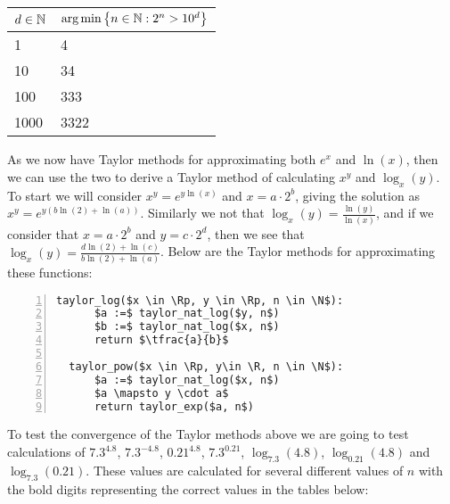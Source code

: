 \begin{center}
\begin{tabular}{|l|l|}
\hline
\(d \in \mathbb{N}\) 
	& \(\textrm{arg}\min\left\{n \in \mathbb{N} : 2^n > 10^d\right\}\)\\\hline
1 & 4\\\hline
10 & 34\\\hline
100 & 333 \\\hline
1000 & 3322\\\hline
\end{tabular}
\end{center}

As we now have Taylor methods for approximating both \(e^x\) and \(\ln(x)\), then we can use the two to derive a Taylor method of calculating \(x^y\) and \(\log_x(y)\). To start we will consider \(x^y = e^{y\ln(x)}\) and \(x = a\cdot2^b\), giving the solution as \(x^y = e^{y(b\ln(2) + \ln(a))}\). Similarly we not that \(\log_x(y) = \frac{\ln(y)}{\ln(x)}\), and if we consider that \(x = a\cdot2^b\) and \(y = c\cdot2^d\), then we see that \(\log_x(y) = \frac{d\ln(2) + \ln(c)}{b\ln(2) + \ln(a)}\). Below are the Taylor methods for approximating these functions:

\begin{lstlisting}[numbers=left,frame=single,mathescape,caption={Taylor Method for calculating \(x^y\) and \(\log_x(y)\)},label={PCD_"taylor pow/log"}]
  taylor_log($x \in \Rp, y \in \Rp, n \in \N$):
      $a :=$ taylor_nat_log($y, n$)
      $b :=$ taylor_nat_log($x, n$)
      return $\tfrac{a}{b}$
  
  taylor_pow($x \in \Rp, y\in \R, n \in \N$):
      $a :=$ taylor_nat_log($x, n$)
      $a \mapsto y \cdot a$
      return taylor_exp($a, n$)
\end{lstlisting}

To test the convergence of the Taylor methods above we are going to test calculations of \(7.3^{4.8}\), \(7.3^{-4.8}\), \(0.21^{4.8}\), \(7.3^{0.21}\), \(\log_{7.3}(4.8)\), \(\log_{0.21}(4.8)\) and \(\log_{7.3}(0.21)\). These values are calculated for several different values of \(n\) with the bold digits representing the correct values in the tables below:

